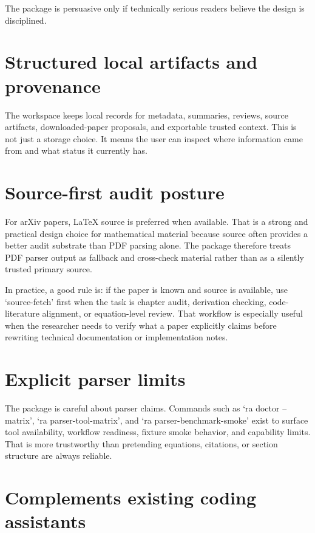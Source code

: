 \documentclass[11pt,a4paper,openany]{book}
\begin{document}
The package is persuasive only if technically serious readers believe the design
is disciplined.

\section{Structured local artifacts and provenance}

The workspace keeps local records for metadata, summaries, reviews, source
artifacts, downloaded-paper proposals, and exportable trusted context. This is
not just a storage choice. It means the user can inspect where information came
from and what status it currently has.

\section{Source-first audit posture}

For arXiv papers, LaTeX source is preferred when available. That is a strong and
practical design choice for mathematical material because source often provides a
better audit substrate than PDF parsing alone. The package therefore treats PDF
parser output as fallback and cross-check material rather than as a silently
trusted primary source.

In practice, a good rule is: if the paper is known and source is available, use
`source-fetch' first when the task is chapter audit, derivation checking,
code-literature alignment, or equation-level review. That workflow is especially
useful when the researcher needs to verify what a paper explicitly claims before
rewriting technical documentation or implementation notes.

\section{Explicit parser limits}

The package is careful about parser claims. Commands such as `ra doctor --matrix',
`ra parser-tool-matrix', and `ra parser-benchmark-smoke' exist to surface tool
availability, workflow readiness, fixture smoke behavior, and capability limits.
That is more trustworthy than pretending equations, citations, or section
structure are always reliable.

\section{Complements existing coding assistants}
\end{document}
